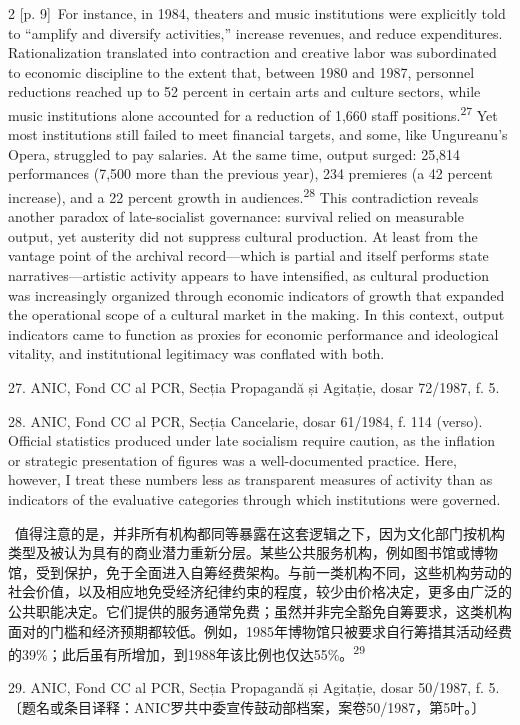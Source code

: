 \documentclass[10pt,a4paper]{article}
\begin{document}
\begin{paracol}{2}
\switchcolumn
{\scriptsize\color{gray} [p. 9]}\ For instance, in 1984, theaters and music institutions were explicitly told to “amplify and diversify activities,” increase revenues, and reduce expenditures. Rationalization translated into contraction and creative labor was subordinated to economic discipline to the extent that, between 1980 and 1987, personnel reductions reached up to 52 percent in certain arts and culture sectors, while music institutions alone accounted for a reduction of 1,660 staff positions.\nobreak\textsuperscript{27} Yet most institutions still failed to meet financial targets, and some, like Ungureanu’s Opera, struggled to pay salaries. At the same time, output surged: 25,814 performances (7,500 more than the previous year), 234 premieres (a 42 percent increase), and a 22 percent growth in audiences.\nobreak\textsuperscript{28} This contradiction reveals another paradox of late-socialist governance: survival relied on measurable output, yet austerity did not suppress cultural production. At least from the vantage point of the archival record—which is partial and itself performs state narratives—artistic activity appears to have intensified, as cultural production was increasingly organized through economic indicators of growth that expanded the operational scope of a cultural market in the making. In this context, output indicators came to function as proxies for economic performance and ideological vitality, and institutional legitimacy was conflated with both.\par{\small 27. ANIC, Fond CC al PCR, Secția Propagandă și Agitație, dosar 72/1987, f. 5.\par}{\small 28. ANIC, Fond CC al PCR, Secția Cancelarie, dosar 61/1984, f. 114 (verso). Official statistics produced under late socialism require caution, as the inflation or strategic presentation of figures was a well-documented practice. Here, however, I treat these numbers less as transparent measures of activity than as indicators of the evaluative categories through which institutions were governed.\par}
\switchcolumn*
{\scriptsize\color{gray} [p. 10]}\ 值得注意的是，并非所有机构都同等暴露在这套逻辑之下，因为文化部门按机构类型及被认为具有的商业潜力重新分层。某些公共服务机构，例如图书馆或博物馆，受到保护，免于全面进入自筹经费架构。与前一类机构不同，这些机构劳动的社会价值，以及相应地免受经济纪律约束的程度，较少由价格决定，更多由广泛的公共职能决定。它们提供的服务通常免费；虽然并非完全豁免自筹要求，这类机构面对的门槛和经济预期都较低。例如，1985年博物馆只被要求自行筹措其活动经费的39\%；此后虽有所增加，到1988年该比例也仅达55\%。\nobreak\textsuperscript{29}\par{\small 29. ANIC, Fond CC al PCR, Secția Propagandă și Agitație, dosar 50/1987, f. 5. 〔题名或条目译释：ANIC罗共中委宣传鼓动部档案，案卷50/1987，第5叶。〕\par}

\end{paracol}
\end{document}
